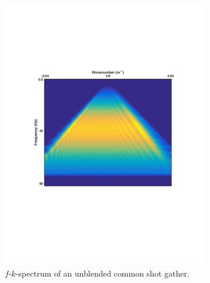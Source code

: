 \begin{figure}
	\centering
	\begin{subfigure}[t]{0.45\textwidth}
		\centering
		\includegraphics[width = \textwidth]{Plots/Mahdad/30iter/FK-UnblendedCRG_r1}
		\caption{$f$-$k$-spectrum of an unblended common shot gather.}
		\label{fig:Ch-Theory-fk-Unblended-data}
	\end{subfigure}
	\centering
	\begin{subfigure}[t]{0.45\textwidth}
		\centering

\end{subfigure}
\end{figure}
